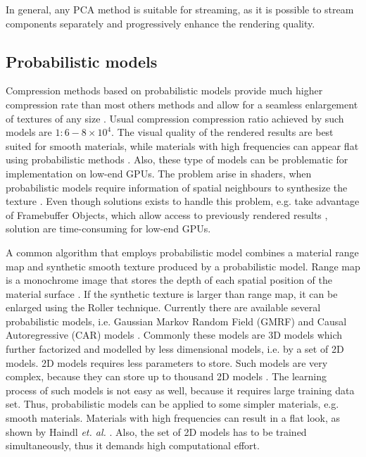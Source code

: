 In general, any PCA method is suitable for streaming, as it is possible to stream components separately and progressively enhance the rendering quality. 



 \subsection{Probabilistic models}
\label{section:prob_methods}

Compression methods based on probabilistic models \cite{car_model,gmrf_model,haindl}
 provide much higher compression rate than most others methods and allow for a seamless enlargement of textures of any size \cite{haindl}. 
Usual compression  compression ratio achieved by such models are $1:6-8\times 10^{4}$.
The visual quality of the rendered results are best suited for smooth materials, while materials with high frequencies can appear flat using probabilistic methods \cite{haindl}.
Also, these type of models can be problematic for implementation on low-end GPUs. 
The problem arise in shaders, when probabilistic models require information of spatial neighbours to synthesize the texture \cite{gmrf_model,haindl}.
Even though solutions exists to handle this problem, e.g. take advantage of Framebuffer Objects, which allow access to previously rendered results \cite{haindl},
solution are time-consuming for low-end GPUs.

A common algorithm that employs probabilistic model combines a material range map and synthetic smooth texture produced by a probabilistic model.
Range map is a monochrome image that stores the depth of each spatial position of the material surface \cite{gmrf_model}.
If the synthetic texture is larger than range map, it can be enlarged using the Roller technique\cite{btfroller}.
Currently there are available several probabilistic models, i.e. Gaussian Markov Random Field (GMRF) and  Causal Autoregressive (CAR) models \cite{haindl,Bishop}.
Commonly these models are 3D models which further factorized and modelled by less dimensional models, i.e. by a set of 2D models.
2D models requires less parameters to store. Such models are very complex, because they can store up to thousand 2D models \cite{haindl_visual}.
The learning process of such models is not easy as well, because it requires large training data set. 
Thus, probabilistic models can be applied to some simpler materials, e.g. smooth materials. 
Materials with high frequencies can result in a flat look, as shown by Haindl  \emph{et. al.} \cite{haindl}.
Also, the set of 2D models has to be trained simultaneously, thus it demands high computational effort.




